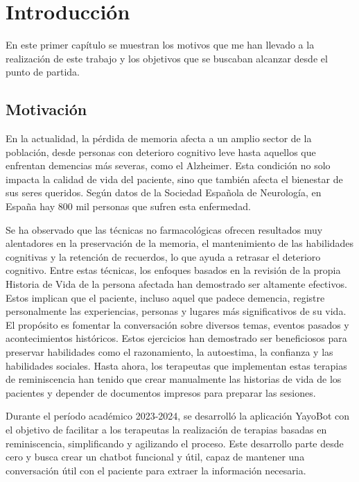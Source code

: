 \chapter{Introducción}
\label{cap:introduccion}


En este primer capítulo se muestran los motivos que me han llevado a la realización de este trabajo y los objetivos que se buscaban alcanzar desde el punto de partida. 


\section{Motivación}

En la actualidad, la pérdida de memoria afecta a un amplio sector de la población, desde personas con deterioro cognitivo leve hasta aquellos que enfrentan demencias más severas, como el Alzheimer. Esta condición no solo impacta la calidad de vida del paciente, sino que también afecta el bienestar de sus seres queridos. Según datos de la Sociedad Española de Neurología, en España hay 800 mil personas que sufren esta enfermedad.

Se ha observado que las técnicas no farmacológicas ofrecen resultados muy alentadores en la preservación de la memoria, el mantenimiento de las habilidades cognitivas y la retención de recuerdos, lo que ayuda a retrasar el deterioro cognitivo. Entre estas técnicas, los enfoques basados en la revisión de la propia Historia de Vida de la persona afectada han demostrado ser altamente efectivos. Estos implican que el paciente, incluso aquel que padece demencia, registre personalmente las experiencias, personas y lugares más significativos de su vida. El propósito es fomentar la conversación sobre diversos temas, eventos pasados y acontecimientos históricos. Estos ejercicios han demostrado ser beneficiosos para preservar habilidades como el razonamiento, la autoestima, la confianza y las habilidades sociales. Hasta ahora, los terapeutas que implementan estas terapias de reminiscencia han tenido que crear manualmente las historias de vida de los pacientes y depender de documentos impresos para preparar las sesiones.

Durante el período académico 2023-2024, se desarrolló la aplicación YayoBot con el objetivo de facilitar a los terapeutas la realización de terapias basadas en reminiscencia, simplificando y agilizando el proceso. Este desarrollo parte desde cero y busca crear un chatbot funcional y útil, capaz de mantener una conversación útil con el paciente para extraer la información necesaria.

